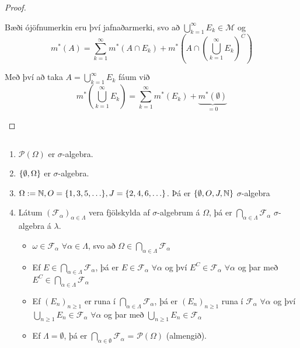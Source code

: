 \documentclass[12pt]{book}
\newcommand{\cP}{\mathcal{P}}
\newcommand{\cF}{\mathcal{F}}
\newcommand{\cM}{\mathcal{M}}
\begin{document}
\begin{proof}
\begin{enumerate}[(i)]
\begin{itemize}
      Bæði ójöfnumerkin eru því jafnaðarmerki, svo að $\bigcup_{k=1}^{\infty} E_k \in \cM$  og
      \[ m^*(A) = \sum_{k=1}^{\infty} m^*(A \cap E_k) + m^*(A \cap (\bigcup_{k=1}^{\infty} E_k)^C) \]

Með því að taka $A = \bigcup_{k=1}^{\infty} E_k$ fáum við \[m^*(\bigcup_{k=1}^{\infty} E_k) = \sum_{k=1}^{\infty} m^*(E_k) + \underbrace{m^*(\emptyset)}_{= 0}\]
  \end{itemize}
  \end{enumerate}
\end{proof}
\subsection{}

\begin{enumerate}
\item  $\cP(\Omega)$ er $\sigma$-algebra.
\item $\{\emptyset, \Omega\}$ er $\sigma$-algebra.
\item $ \Omega := \N, O = \set{1,3,5,\dotsc}, J = \set{2,4,6,\dotsc}$.
Þá er $\{\emptyset, O, J,\mathbb{N}\}$ $\sigma$-algebra
\item  Látum $(\mathcal{F}_{\alpha})_{\alpha \in \Lambda}$ vera fjölskylda af
$\sigma$-algebrum á $\Omega$, þá er $\bigcap_{\alpha \in \Lambda} \mathcal{F}_{\alpha}$
$\sigma$-algebra á $\lambda$.
\begin{itemize}
\item $\omega \in \cF_{\alpha}$ $\forall \alpha \in \Lambda$, svo að $\Omega \in \bigcap_{\alpha \in \Lambda} \cF_{\alpha}$
\item Ef $E \in \bigcap_{\alpha \in \Lambda} \mathcal{F}_{\alpha}$, þá er $E \in \cF_{\alpha}$ $\forall \alpha$ og
  því $E^C \in \cF_{\alpha}$ $\forall \alpha$ og þar með $E^C \in \bigcap_{\alpha \in \Lambda} \mathcal{F}_{\alpha}$


\item Ef $(E_n)_{n \geq 1}$ er runa í $\bigcap_{\alpha \in \Lambda} \mathcal{F}_{\alpha}$, þá er $(E_n)_{n \geq 1}$
  runa í $\cF_{\alpha}$ $\forall \alpha$ og því $\bigcup_{n \geq 1} E_n \in \cF_{\alpha}$ $\forall \alpha$ og þar með
  $\bigcup_{n\geq 1} E_n \in \cF_{\alpha}$

\item
  \begin{ath}
    
  Ef $\Lambda = \emptyset$, þá er $\bigcap_{\alpha \in \emptyset} \cF_{\alpha}$ = $\cP(\Omega)$ (almengið).
\end{ath}
\end{itemize}


\end{enumerate}
\end{document}

